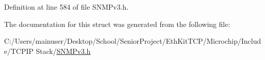 Definition at line 584 of file S\+N\+M\+Pv3.\+h.



The documentation for this struct was generated from the following file\+:\begin{DoxyCompactItemize}
\item 
C\+:/\+Users/mainuser/\+Desktop/\+School/\+Senior\+Project/\+Eth\+Kit\+T\+C\+P/\+Microchip/\+Include/\+T\+C\+P\+I\+P Stack/\hyperlink{_s_n_m_pv3_8h}{S\+N\+M\+Pv3.\+h}\end{DoxyCompactItemize}
